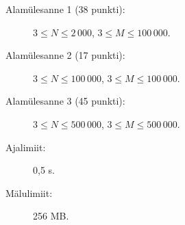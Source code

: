 ﻿\documentclass{boi2014-et}
\begin{document}
    \Scoring

    \begin{description}
        \item[Alamülesanne 1 (38 punkti):] $3 \le N \le 2\,000$, $3 \le M \le 100\,000$.
        \item[Alamülesanne 2 (17 punkti):] $3 \le N \le 100\,000$, $3 \le M \le 100\,000$.
        \item[Alamülesanne 3 (45 punkti):] $3 \le N \le 500\,000$, $3 \le M \le 500\,000$.
    \end{description}

    \Constraints

    \begin{description}
        \item[Ajalimiit:] 0,5 s.
        \item[Mälulimiit:] 256 MB.
    \end{description}
\end{document}
